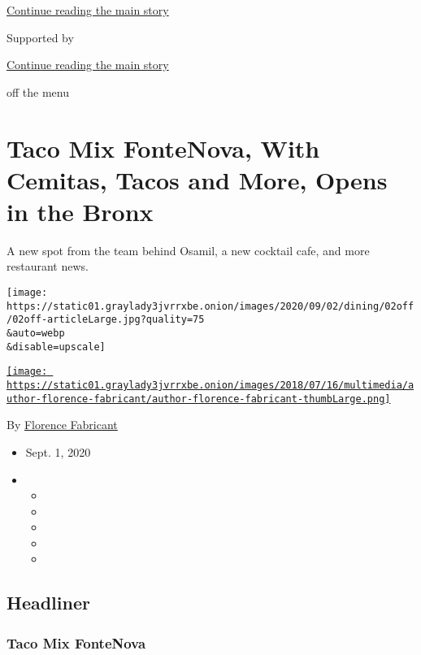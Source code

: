 \protect\hyperlink{after-top}{Continue reading the main story}

Supported by

\protect\hyperlink{after-sponsor}{Continue reading the main story}

off the menu

\hypertarget{taco-mix-fontenova-with-cemitas-tacos-and-more-opens-in-the-bronx}{%
\section{Taco Mix FonteNova, With Cemitas, Tacos and More, Opens in the
Bronx}\label{taco-mix-fontenova-with-cemitas-tacos-and-more-opens-in-the-bronx}}

A new spot from the team behind Osamil, a new cocktail cafe, and more
restaurant news.

\texttt{[image: https://static01.graylady3jvrrxbe.onion/images/2020/09/02/dining/02off/02off-articleLarge.jpg?quality=75\\\&auto=webp\\\&disable=upscale]}

\href{https://www.nytimes3xbfgragh.onion/by/florence-fabricant}{\texttt{[image: https://static01.graylady3jvrrxbe.onion/images/2018/07/16/multimedia/author-florence-fabricant/author-florence-fabricant-thumbLarge.png]}}

By
\href{https://www.nytimes3xbfgragh.onion/by/florence-fabricant}{Florence
Fabricant}

\begin{itemize}
\item
  Sept. 1, 2020
\item
  \begin{itemize}
  \item
  \item
  \item
  \item
  \item
  \end{itemize}
\end{itemize}

\hypertarget{headliner}{%
\subsection{Headliner}\label{headliner}}

\hypertarget{taco-mix-fontenova}{%
\subsubsection{Taco Mix FonteNova}\label{taco-mix-fontenova}}

